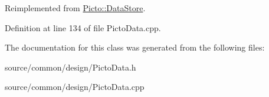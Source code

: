 Reimplemented from \hyperlink{class_picto_1_1_data_store_a077c9284e2d18d50b72e0fea1a5eeacb}{Picto\-::\-Data\-Store}.



Definition at line 134 of file Picto\-Data.\-cpp.



The documentation for this class was generated from the following files\-:\begin{DoxyCompactItemize}
\item 
source/common/design/Picto\-Data.\-h\item 
source/common/design/Picto\-Data.\-cpp\end{DoxyCompactItemize}
